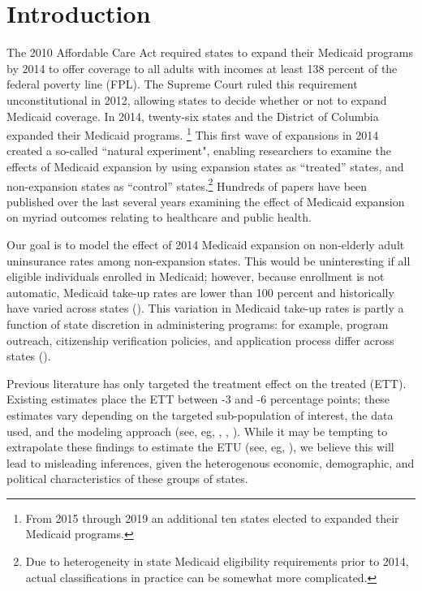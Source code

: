 \documentclass[final]{article}
\begin{document}
\maketitle

\section{Introduction}

The 2010 Affordable Care Act required states to expand their Medicaid programs by 2014 to offer coverage to all adults with incomes at least 138 percent of the federal poverty line (FPL). The Supreme Court ruled this requirement unconstitutional in 2012, allowing states to decide whether or not to expand Medicaid coverage. In 2014, twenty-six states and the District of Columbia expanded their Medicaid programs. \footnote{From 2015 through 2019 an additional ten states elected to expanded their Medicaid programs.} This first wave of expansions in 2014 created a so-called ``natural experiment", enabling researchers to examine the effects of Medicaid expansion by using expansion states as ``treated'' states, and non-expansion states as ``control'' states.\footnote{Due to heterogeneity in state Medicaid eligibility requirements prior to 2014, actual classifications in practice can be somewhat more complicated.} Hundreds of papers have been published over the last several years examining the effect of Medicaid expansion on myriad outcomes relating to healthcare and public health.

Our goal is to model the effect of 2014 Medicaid expansion on non-elderly adult uninsurance rates among non-expansion states. This would be uninteresting if all eligible individuals enrolled in Medicaid; however, because enrollment is not automatic, Medicaid take-up rates are lower than 100 percent and historically have varied across states (\cite{sommers2012understanding}). This variation in Medicaid take-up rates is partly a function of state discretion in administering programs: for example, program outreach, citizenship verification policies, and application process differ across states (\cite{courtemanche2017early}). 

Previous literature has only targeted the treatment effect on the treated (ETT). Existing estimates place the ETT between -3 and -6 percentage points; these estimates vary depending on the targeted sub-population of interest, the data used, and the modeling approach (see, eg, \cite{courtemanche2017early}, \cite{kaestner2017effects}, \cite{frean2017premium}). While it may be tempting to extrapolate these findings to estimate the ETU (see, eg, \cite{miller2019medicaid}), we believe this will lead to misleading inferences, given the heterogenous economic, demographic, and political characteristics of these groups of states.
\end{document}
